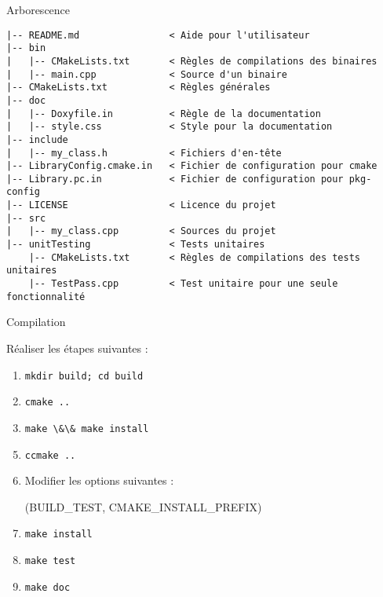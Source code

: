\documentclass{beamer}
\begin{document}
\begin{frame}[fragile]{Arborescence}
  \begin{scriptsize}
\begin{verbatim}
|-- README.md                < Aide pour l'utilisateur
|-- bin                        
|   |-- CMakeLists.txt       < Règles de compilations des binaires
|   |-- main.cpp             < Source d'un binaire
|-- CMakeLists.txt           < Règles générales
|-- doc                      
|   |-- Doxyfile.in          < Règle de la documentation
|   |-- style.css            < Style pour la documentation
|-- include                  
|   |-- my_class.h           < Fichiers d'en-tête
|-- LibraryConfig.cmake.in   < Fichier de configuration pour cmake
|-- Library.pc.in            < Fichier de configuration pour pkg-config
|-- LICENSE                  < Licence du projet
|-- src
|   |-- my_class.cpp         < Sources du projet        
|-- unitTesting              < Tests unitaires
    |-- CMakeLists.txt       < Règles de compilations des tests unitaires
    |-- TestPass.cpp         < Test unitaire pour une seule fonctionnalité
\end{verbatim}
  \end{scriptsize}
\end{frame}

\begin{frame}{Compilation}
  \begin{exampleblock}{Réaliser les étapes suivantes :}
    \begin{enumerate}
    \item \verb?mkdir build; cd build?
    \item \verb?cmake ..?
    \item \verb?make \&\& make install? 
    \end{enumerate}
  \end{exampleblock}
  \pause
  \begin{exampleblock}{}
    \begin{enumerate}
      \setcounter{enumi}{4}
    \item \verb?ccmake ..?
    \item Modifier les options suivantes :\\ \begin{scriptsize}(BUILD\_TEST,  CMAKE\_INSTALL\_PREFIX)\end{scriptsize}
    \item \verb?make install?
    \item \verb?make test?
    \end{enumerate}
  \end{exampleblock}
  \pause
  \begin{exampleblock}{}
    \begin{enumerate}
      \setcounter{enumi}{8}
    \item \verb?make doc?
    \end{enumerate}
  \end{exampleblock}
\end{frame}
\end{document}
